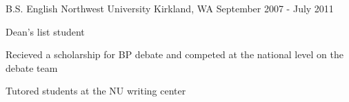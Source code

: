 

\begin{cventries}

  \cventry
    {B.S. English} %
    {Northwest University} %
    {Kirkland, WA} %
    {September 2007 - July 2011} %
    {
      \begin{cvitems} %
        \item {Dean's list student}
        \item {Recieved a scholarship for BP debate and competed at the national level on the debate team}
        \item {Tutored students at the NU writing center}
      \end{cvitems}
    }

\end{cventries}
